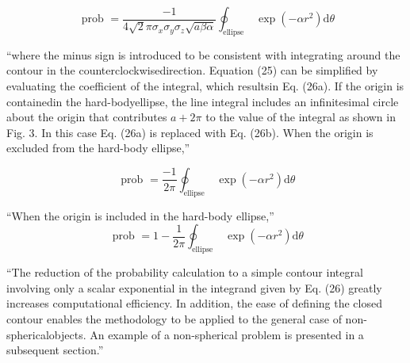 \begin{equation}
    \text { prob }=\frac{-1}{4 \sqrt{2} \pi \sigma_{x} \sigma_{y} \sigma_{z} \sqrt{a \beta \alpha}} \oint_{\text {ellipse }} \exp \left(-\alpha r^{2}\right) \mathrm{d} \theta
\end{equation}

``where the minus sign is introduced to be consistent with integrating around the contour in the counterclockwisedirection. Equation (25) can be simplified by evaluating the coefficient of the integral, which resultsin Eq. (26a). If the origin is containedin the hard-bodyellipse, the line integral includes an infinitesimal circle about the origin that contributes $a+2 \pi$ to the value of the integral as shown in Fig. 3. In this case Eq. (26a) is replaced with Eq. (26b). When the origin is excluded from the hard-body ellipse,''

\begin{equation}
    \text { prob }=\frac{-1}{2 \pi} \oint_{\text {ellipse }} \exp \left(-\alpha r^{2}\right) \mathrm{d} \theta
\end{equation}

``When the origin is included in the hard-body ellipse,''
\begin{equation}
    \text { prob }=1-\frac{1}{2 \pi} \oint_{\text {ellipse }} \exp \left(-\alpha r^{2}\right) \mathrm{d} \theta
\end{equation}

``The reduction of the probability calculation to a simple contour integral involving only a scalar exponential in the integrand given by Eq. (26) greatly increases computational efficiency. In addition, the ease of defining the closed contour enables the methodology to be applied to the general case of non-sphericalobjects. An example of a non-spherical problem is presented in a subsequent section.''

